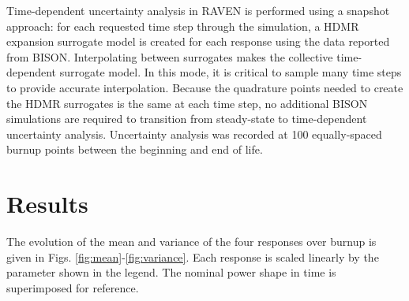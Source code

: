 \documentclass{anstrans} \usepackage{amsmath} \usepackage{amssymb}
\begin{document}
Time-dependent uncertainty analysis in RAVEN is performed using a snapshot approach: for each requested time
step through the simulation, a HDMR expansion surrogate model is created for each response using the data reported from BISON.
Interpolating between surrogates makes the collective time-dependent surrogate model.  In this mode, it is
critical to sample many time steps to provide accurate interpolation.  Because the quadrature points needed to
create the HDMR surrogates is the same at each time step, no additional BISON simulations are required to
transition from steady-state to time-dependent uncertainty analysis. Uncertainty analysis was recorded at 100
equally-spaced burnup points between the beginning and end of life.

\section{Results}\label{results}
The evolution of the mean and variance of the four responses over burnup is given in Figs. \ref{fig:mean}-\ref{fig:variance}. Each
response is scaled linearly by the parameter shown in the legend.  The nominal power shape in time is superimposed
for reference.  
\end{document}
